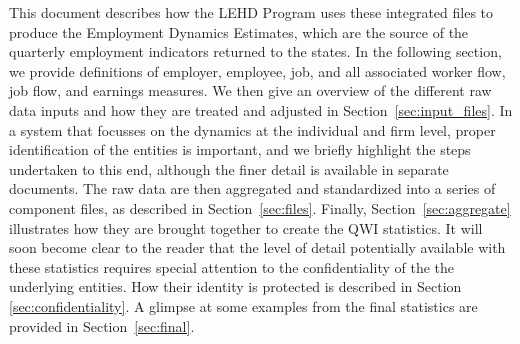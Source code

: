 This document describes how the LEHD Program uses these integrated files to
produce the Employment Dynamics Estimates, which are the source of the
quarterly employment indicators returned to the states.  In the following
section, we provide definitions of employer, employee, job, and all
associated worker flow, job flow, and earnings measures. We then give an
overview of the different raw data inputs and how they are treated and
adjusted in Section~\ref{sec:input_files}. In a system that focusses on the
dynamics at the individual and firm level, proper identification of the
entities is important, and we briefly highlight the steps undertaken to
this end, although the finer detail is available in separate documents. The
raw data are then aggregated and standardized into a series of component
files, as described in Section~\ref{sec:files}. Finally,
Section~\ref{sec:aggregate} illustrates how they are brought together to
create the QWI statistics. It will soon become clear to the reader that the
level of detail potentially available with these statistics requires
special attention to the confidentiality of the the underlying entities.
How their identity is protected is described in Section
\ref{sec:confidentiality}. A glimpse at some examples from the final
statistics are provided in Section~\ref{sec:final}.

